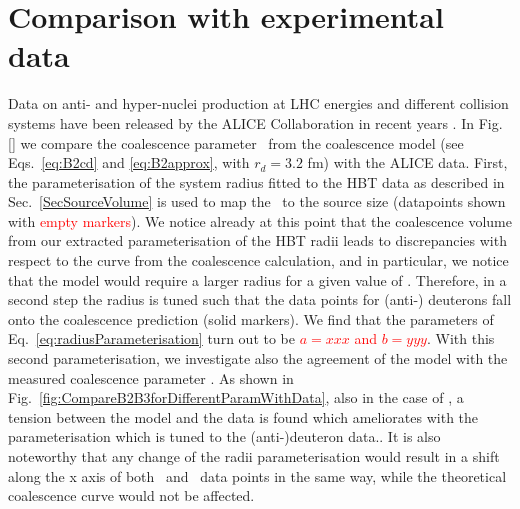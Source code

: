 \documentclass[a4paper,11pt]{scrartcl} %
\begin{document}
\section{Comparison with experimental data}\label{sec:comparison}

Data on anti- and hyper-nuclei production at LHC energies and different collision systems have been released by the ALICE Collaboration in recent years \cite{}. 
In Fig. \ref{} we compare the coalescence parameter \btwo~from the coalescence model (see Eqs.~\ref{eq:B2cd} and \ref{eq:B2approx}, with $r_{d} = 3.2$ fm) with the ALICE data.  
First, the parameterisation of the system radius fitted to the HBT data as described in Sec.~\ref{SecSourceVolume} is used to map the \avdNdeta~to the source size (datapoints shown with \textcolor{red}{empty markers}).
We notice already at this point that the coalescence volume from our extracted parameterisation of the HBT radii leads to discrepancies with respect to the curve from the coalescence calculation, and in particular, we notice that the model would require a larger radius for a given value of \btwo.
Therefore, in a second step the radius is tuned such that the data points for (anti-) deuterons fall onto the coalescence prediction (solid markers). We find that the parameters of Eq.~\ref{eq:radiusParameterisation} turn out to be \textcolor{red}{$a = xxx$ and $b = yyy$}. 
With this second parameterisation, we investigate also the agreement of the model with the measured coalescence parameter \bthree. As shown in Fig.~\ref{fig:CompareB2B3forDifferentParamWithData}, also in the case of \bthree, a tension between the model and the data is found which ameliorates with the parameterisation which is tuned to the (anti-)deuteron data..
It is also noteworthy that any change of the radii parameterisation would result in a shift along the x axis of both \btwo~and \bthree~data points in the same way, while the theoretical coalescence curve would not be affected. 
 
\end{document}

